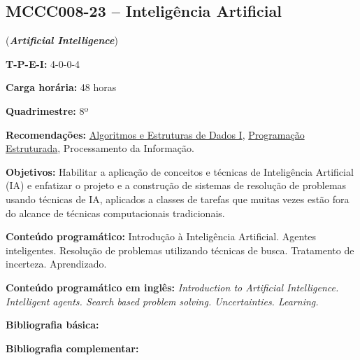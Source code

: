 \documentclass[class=article, crop=false]{standalone}
\begin{document}
\subsection*{MCCC008-23 -- Inteligência Artificial}
\label{disc:ia}

(\textbf{\textit{Artificial Intelligence}})

\begin{center}
    \begin{minipage}{0.85\textwidth}
        \textbf{T-P-E-I:} 4-0-0-4
        
        \textbf{Carga horária:} 48 horas
        
        \textbf{Quadrimestre:} 8º
        
        \textbf{Recomendações:} 
        \hyperref[disc:aedI]{Algoritmos e Estruturas de Dados I},
        \hyperref[disc:pe]{Programação Estruturada},
        Processamento da Informação.
    \end{minipage}
\end{center}

\textbf{Objetivos:}
Habilitar a aplicação de conceitos e técnicas de Inteligência Artificial (IA) e
enfatizar o projeto e a construção de sistemas de resolução de problemas usando
técnicas de IA, aplicados a classes de tarefas que muitas vezes estão fora do
alcance de técnicas computacionais tradicionais.

\textbf{Conteúdo programático:}
Introdução à Inteligência Artificial.
Agentes inteligentes.
Resolução de problemas utilizando técnicas de busca.
Tratamento de incerteza.
Aprendizado.

\textbf{Conteúdo programático em inglês:}
\textit{Introduction to Artificial Intelligence.
Intelligent agents.
Search based problem solving.
Uncertainties.
Learning.}

\newrefsection
\textbf{Bibliografia básica:}
\nocite{2003-russel-etal,2003-rezende,1998-sutton-etal}
\printbibliography

\newrefsection
\textbf{Bibliografia complementar:}
\nocite{2006-bittencourt,2004-branchman,2001-mortari,2018-sutton-etal,2009-wooldridge}
\printbibliography
\end{document}
